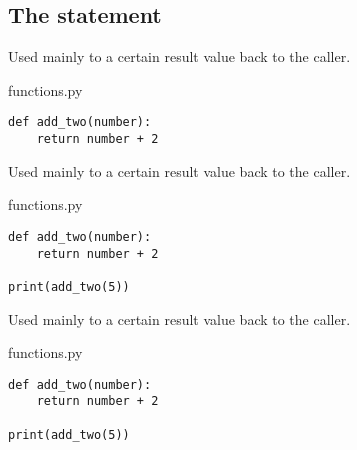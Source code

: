 \documentclass[aspectratio=1610,slidestop]{beamer}
\begin{document}
\subsection{The  statement}

\begin{pframe}
 Used mainly to  a certain result value back to the caller.
 \begin{pythonfile}{functions.py}
  \begin{verbatim}
def add_two(number):
    return number + 2
  \end{verbatim}
 \end{pythonfile}
\end{pframe}


\begin{pframe}
 Used mainly to  a certain result value back to the caller.
 \begin{pythonfile}{functions.py}
  \begin{verbatim}
def add_two(number):
    return number + 2

print(add_two(5))
  \end{verbatim}
 \end{pythonfile}
\end{pframe}


\begin{pframe}
 Used mainly to  a certain result value back to the caller.
 \medskip

 \begin{minipage}[t]{0.47\textwidth}
  \begin{pythonfile}{functions.py}
   \begin{verbatim}
def add_two(number):
    return number + 2

print(add_two(5))
   \end{verbatim}
  \end{pythonfile}
 \end{minipage}\qquad
 \begin{minipage}[t]{0.47\textwidth}
 \vspace{-2.55cm}
 \begin{terminal}
 \end{terminal}
 \end{minipage}
\end{pframe}
\end{document}
